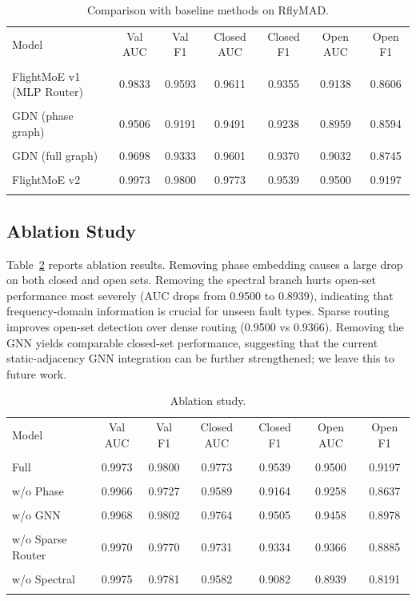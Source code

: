 \documentclass[letterpaper]{article}
\begin{document}
\begin{table}[htbp]
\centering
\caption{Comparison with baseline methods on RflyMAD.}
\label{tab:baseline}
\begin{tabular}{lcccccc}
\toprule
Model & Val AUC & Val F1 & Closed AUC & Closed F1 & Open AUC & Open F1 \\\\
\midrule
FlightMoE v1 (MLP Router) &0.9833 &0.9593 &0.9611 &0.9355 &0.9138 &0.8606 \\\\
GDN (phase graph) &0.9506 &0.9191 &0.9491 &0.9238 &0.8959 &0.8594 \\\\
GDN (full graph) &0.9698 &0.9333 &0.9601 &0.9370 &0.9032 &0.8745 \\\\
FlightMoE v2 &0.9973 &0.9800 &0.9773 &0.9539 &0.9500 &0.9197 \\\\
\bottomrule
\end{tabular}
\end{table}

\subsection{Ablation Study}
Table~\ref{tab:ablation} reports ablation results. Removing phase embedding causes a large drop on both closed and open sets. Removing the spectral branch hurts open-set performance most severely (AUC drops from 0.9500 to 0.8939), indicating that frequency-domain information is crucial for unseen fault types. Sparse routing improves open-set detection over dense routing (0.9500 vs 0.9366). Removing the GNN yields comparable closed-set performance, suggesting that the current static-adjacency GNN integration can be further strengthened; we leave this to future work.

\begin{table}[htbp]
\centering
\caption{Ablation study.}
\label{tab:ablation}
\begin{tabular}{lcccccc}
\toprule
Model & Val AUC & Val F1 & Closed AUC & Closed F1 & Open AUC & Open F1 \\\\
\midrule
Full &0.9973 &0.9800 &0.9773 &0.9539 &0.9500 &0.9197 \\\\
w/o Phase &0.9966 &0.9727 &0.9589 &0.9164 &0.9258 &0.8637 \\\\
w/o GNN &0.9968 &0.9802 &0.9764 &0.9505 &0.9458 &0.8978 \\\\
w/o Sparse Router &0.9970 &0.9770 &0.9731 &0.9334 &0.9366 &0.8885 \\\\
w/o Spectral &0.9975 &0.9781 &0.9582 &0.9082 &0.8939 &0.8191 \\\\
\bottomrule
\end{tabular}
\end{table}
\end{document}
